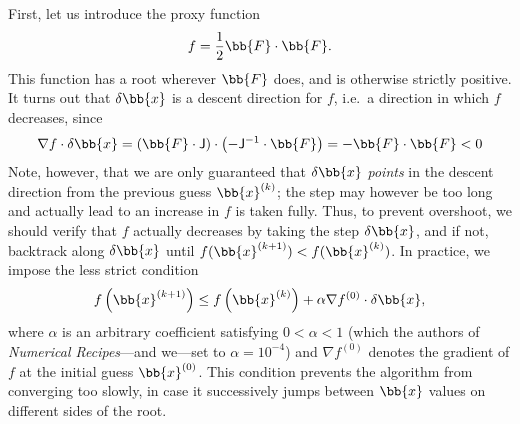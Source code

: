 \documentclass{notes}
\newcommand{\Jac}{\mathsf{J}}
\begin{document}
    First, let us introduce the proxy function
    \begin{equation}
        f = \frac{1}{2}\bb{F}\cdot\bb{F}.
    \end{equation}
    This function has a root wherever $\bb{F}$ does, and is otherwise strictly
    positive. It turns out that $\delta\bb{x}$ is a descent direction for $f$,
    i.e.\ a direction in which $f$ decreases, since
    \begin{equation}
        \nabla f\cdot\delta\bb{x} = \left( \bb{F}\cdot\Jac \right)\cdot
        \left( -\Jac^{-1}\cdot\bb{F} \right) = -\bb{F}\cdot\bb{F} < 0
    \end{equation}
    Note, however, that we are only guaranteed that $\delta\bb{x}$ {\em points}
    in the descent direction from the previous guess $\bb{x}^{(k)}$; the step
    may however be too long and actually lead to an increase in $f$ is taken
    fully. Thus, to prevent overshoot, we should verify that $f$ actually
    decreases by taking the step $\delta\bb{x}$, and if not, backtrack along
    $\delta\bb{x}$ until $f(\bb{x}^{(k+1)}) < f(\bb{x}^{(k)})$. In practice,
    we impose the less strict condition
    \begin{equation}\label{eq:newton:acc:cond}
        f\left(\bb{x}^{(k+1)}\right) \leq f\left(\bb{x}^{(k)}\right) +
        \alpha\nabla f^{(0)}\cdot\delta\bb{x},
    \end{equation}
    where $\alpha$ is an arbitrary coefficient satisfying $0<\alpha<1$ (which
    the authors of {\em Numerical Recipes}---and we---set to $\alpha=10^{-4}$)
    and $\nabla f^{(0)}$ denotes the gradient of $f$ at the initial guess
    $\bb{x}^{(0)}$. This condition prevents the algorithm from converging too
    slowly, in case it successively jumps between $\bb{x}$ values on different
    sides of the root.
\end{document}
